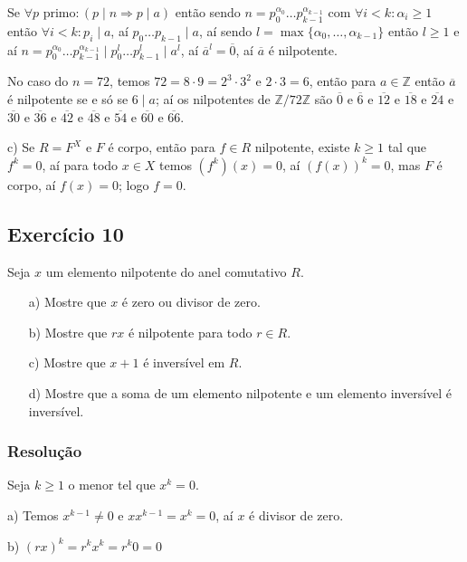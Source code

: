 \documentclass[10pt,a4paper]{article}
\begin{document}
\medskip
\noindent
Se $\forall p\text{ primo}:(p\mid n\Rightarrow p\mid a)$ então sendo $n=p_0^{\alpha_0}\dots p_{k-1}^{\alpha_{k-1}}$ com $\forall i<k:\alpha_i\geq 1$ então $\forall i<k:p_i\mid a$, aí $p_0\dots p_{k-1}\mid a$, aí sendo $l=\max\{\alpha_0,\dots,\alpha_{k-1}\}$ então $l\geq 1$ e aí $n=p_0^{\alpha_0}\dots p_{k-1}^{\alpha_{k-1}}\mid p_0^l\dots p_{k-1}^l\mid a^l$, aí $\overline{a}^l=\overline{0}$, aí $\overline{a}$ é nilpotente.

\medskip
\noindent
No caso do $n=72$, temos $72=8\cdot 9=2^3\cdot 3^2$ e $2\cdot 3=6$, então para $a\in\mathbb{Z}$ então $\overline{a}$ é nilpotente se e só se $6\mid a$; aí os nilpotentes de $\mathbb{Z}/72\mathbb{Z}$ são $\overline{0}$ e $\overline{6}$ e $\overline{12}$ e $\overline{18}$ e $\overline{24}$ e $\overline{30}$ e $\overline{36}$ e $\overline{42}$ e $\overline{48}$ e $\overline{54}$ e $\overline{60}$ e $\overline{66}$.

\medskip
\noindent
c) Se $R=F^X$ e $F$ é corpo, então para $f\in R$ nilpotente, existe $k\geq 1$ tal que $f^k=0$, aí para todo $x\in X$ temos $(f^k)(x)=0$, aí $(f(x))^k=0$, mas $F$ é corpo, aí $f(x)=0$; logo $f=0$. 

\subsection*{Exercício 10}

Seja $x$ um elemento nilpotente do anel comutativo $R$.

\begin{itemize}
\item[a)] Mostre que $x$ é zero ou divisor de zero.
\item[b)] Mostre que $rx$ é nilpotente para todo $r\in R$.
\item[c)] Mostre que $x+1$ é inversível em $R$.
\item[d)] Mostre que a soma de um elemento nilpotente e um elemento inversível é inversível.
\end{itemize}

\subsubsection*{Resolução}

Seja $k\geq 1$ o menor tel que $x^k=0$.

\medskip
\noindent
a) Temos $x^{k-1}\neq0$ e $xx^{k-1}=x^k=0$, aí $x$ é divisor de zero.

\medskip
\noindent
b) $(rx)^k=r^kx^k=r^k0=0$
\end{document}
